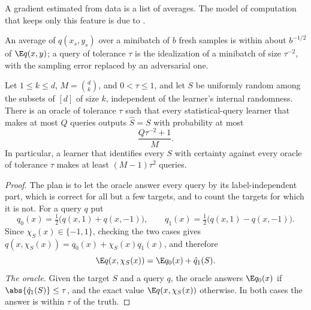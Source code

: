 \begin{refsection}
A gradient estimated from data is a list of averages. The model of computation that keeps only this feature is due to \textcite{Kearns1998}.


An average of $q(x_s,y_s)$ over a minibatch of $b$ fresh samples is within about $b^{-1/2}$ of $\E q(x,y)$; a query of tolerance $\tau$ is the idealization of a minibatch of size $\tau^{-2}$, with the sampling error replaced by an adversarial one.

\begin{theorem}\label{thm:parity:sq}
Let $1\le k\le d$, $M=\binom dk$, and $0<\tau\le1$, and let $S$ be uniformly random among the subsets of $[d]$ of size $k$, independent of the learner's internal randomness. There is an oracle of tolerance $\tau$ such that every statistical-query learner that makes at most $Q$ queries outputs $\hat S=S$ with probability at most
\[
  \frac{Q\tau^{-2}+1}{M}.
\]
In particular, a learner that identifies every $S$ with certainty against every oracle of tolerance $\tau$ makes at least $(M-1)\tau^2$ queries.
\end{theorem}

\begin{proof}
The plan is to let the oracle answer every query by its label-independent part, which is correct for all but a few targets, and to count the targets for which it is not. For a query $q$ put
\[
  q_0(x)=\tfrac12\bigl(q(x,1)+q(x,-1)\bigr),\qquad q_1(x)=\tfrac12\bigl(q(x,1)-q(x,-1)\bigr).
\]
Since $\chi_S(x)\in\{-1,1\}$, checking the two cases gives $q(x,\chi_S(x))=q_0(x)+\chi_S(x)q_1(x)$, and therefore
\[
  \E q(x,\chi_S(x))=\E q_0(x)+\hat q_1(S).
\]
\emph{The oracle.} Given the target $S$ and a query $q$, the oracle answers $\E q_0(x)$ if $\abs{\hat q_1(S)}\le\tau$, and the exact value $\E q(x,\chi_S(x))$ otherwise. In both cases the answer is within $\tau$ of the truth.


\end{proof}
\end{refsection}
